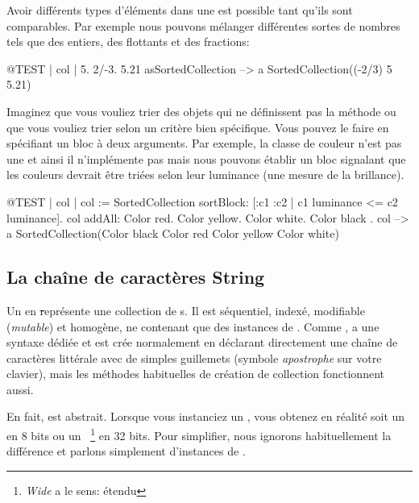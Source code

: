 \documentclass[a4paper,10pt,twoside]{book}
\begin{document}
Avoir différents types d'éléments dans une  est
possible tant qu'ils sont comparables.
Par exemple nous pouvons mélanger différentes sortes de nombres tels
que des entiers, des flottants et des fractions:
\begin{code}{@TEST | col |}
{ 5. 2/-3. 5.21 } asSortedCollection --> a SortedCollection((-2/3) 5 5.21)
\end{code}

Imaginez que vous vouliez trier des objets qui ne définissent pas
la méthode \ct{<=} ou que vous vouliez trier selon un critère bien spécifique.
Vous pouvez le faire en spécifiant un bloc à deux arguments.
Par exemple, la classe de couleur  n'est pas une  et
ainsi il n'implémente pas \ct{<=} mais nous pouvons établir un bloc
signalant que les couleurs devrait être triées selon leur
luminance (une mesure de la brillance).

\begin{code}{@TEST | col |}
col := SortedCollection sortBlock: [:c1 :c2 | c1 luminance <= c2 luminance].
col addAll: { Color red. Color yellow. Color white. Color black }.
col --> a SortedCollection(Color black Color red Color yellow Color white)
\end{code}

\subsection{La chaîne de caractères String}
Un  en \st représente une collection de s.
Il est séquentiel, indexé, modifiable (\emph{mutable}) et homogène, ne
contenant que des instances de .
Comme ,  a une syntaxe dédiée et est crée normalement
en déclarant directement une chaîne de caractères littérale avec
de simples guillemets 
(symbole \emph{apostrophe} sur votre clavier),
mais les méthodes habituelles de création de collection fonctionnent aussi.


En fait,  est abstrait.
Lorsque vous instanciez un , vous obtenez en réalité soit
un  en 8 bits ou un ~\footnote{\emph{Wide} a le sens: étendu} en 32 bits.
Pour simplifier, nous ignorons habituellement la différence et parlons simplement d'instances de .
\end{document}
